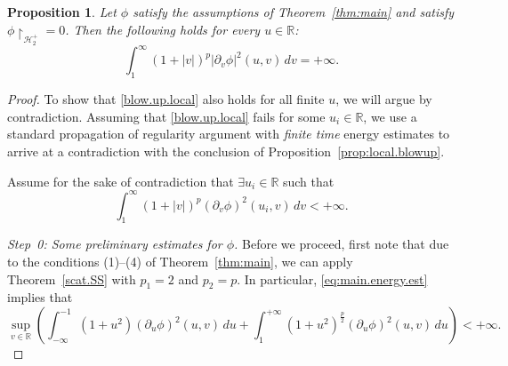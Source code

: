 \documentclass[10pt, reqno]{amsart}
\newtheorem{proposition}[theorem]{Proposition}
\theoremstyle{definition}
\theoremstyle{remark}
\numberwithin{equation}{section}
\newcommand{\rd}{\partial}
\newcommand{\0}{\emptyset}
\newcommand{\f}{\frac}
\newcommand{\pfstep}[1]{\vspace{.5em} {\it #1.}}
\begin{document}
\begin{proposition}\label{prop:final.blowup}
Let $\phi$ satisfy the assumptions of Theorem~\ref{thm:main} and satisfy $\phi\restriction_{\mathcal{H}^+_2} = 0$. Then the following holds for every $u\in \mathbb R$:
\begin{equation}\label{blow.up.local}
\int_1^\infty (1+|v|)^{p} |\rd_v\phi|^2(u,v) \, dv = +\infty.
\end{equation}
\end{proposition}
\begin{proof}
To show that \eqref{blow.up.local} also holds for all finite $u$, we will argue by contradiction. Assuming that \eqref{blow.up.local} fails for some $u_i \in \mathbb R$, we use a standard propagation of regularity argument with \emph{finite time} energy estimates to arrive at a contradiction with the conclusion of Proposition~\ref{prop:local.blowup}.

Assume for the sake of contradiction that $\exists u_i\in \mathbb R$ such that
\begin{equation}\label{localEE.contra}
\int_1^{\infty} (1+|v|)^{p}(\rd_v\phi)^2(u_i,v)\, dv < +\infty.
\end{equation}

\pfstep{Step~0: Some preliminary estimates for $\phi$}
Before we proceed, first note that due to the conditions (1)--(4) of Theorem~\ref{thm:main}, we can apply Theorem~\ref{scat.SS} with $p_1 = 2$ and $p_2 = p$. In particular, \eqref{eq:main.energy.est} implies that
\begin{equation}\label{eq:localEE.nonlinear.duphi.L1}
\sup_{v\in \mathbb R} \left( \int_{-\infty}^{-1} (1+u^2) (\rd_u\phi)^2(u,v) \, du + \int_1^{+\infty} (1+ u^2)^{\f p2} (\rd_u\phi)^2(u,v) \, du \right) < +\infty.
\end{equation}


\end{proof}
\end{document}
